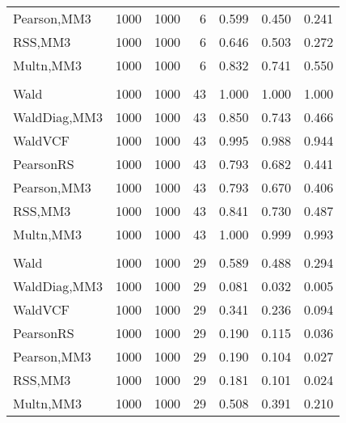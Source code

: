 \documentclass[
]{article}
\begin{document}
\begin{table}[H]
{\begin{tabular}[t]{lrrrrrr}
\hspace{1em}Pearson,MM3 & 1000 & 1000 & 6 & 0.599 & 0.450 & 0.241\\
\hspace{1em}RSS,MM3 & 1000 & 1000 & 6 & 0.646 & 0.503 & 0.272\\
\hspace{1em}Multn,MM3 & 1000 & 1000 & 6 & 0.832 & 0.741 & 0.550\\
\addlinespace[0.3em]
\multicolumn{7}{l}{\textbf{1F 15V}}\\
\hspace{1em}Wald & 1000 & 1000 & 43 & 1.000 & 1.000 & 1.000\\
\hspace{1em}WaldDiag,MM3 & 1000 & 1000 & 43 & 0.850 & 0.743 & 0.466\\
\hspace{1em}WaldVCF & 1000 & 1000 & 43 & 0.995 & 0.988 & 0.944\\
\hspace{1em}PearsonRS & 1000 & 1000 & 43 & 0.793 & 0.682 & 0.441\\
\hspace{1em}Pearson,MM3 & 1000 & 1000 & 43 & 0.793 & 0.670 & 0.406\\
\hspace{1em}RSS,MM3 & 1000 & 1000 & 43 & 0.841 & 0.730 & 0.487\\
\hspace{1em}Multn,MM3 & 1000 & 1000 & 43 & 1.000 & 0.999 & 0.993\\
\addlinespace[0.3em]
\multicolumn{7}{l}{\textbf{2F 10V}}\\
\hspace{1em}Wald & 1000 & 1000 & 29 & 0.589 & 0.488 & 0.294\\
\hspace{1em}WaldDiag,MM3 & 1000 & 1000 & 29 & 0.081 & 0.032 & 0.005\\
\hspace{1em}WaldVCF & 1000 & 1000 & 29 & 0.341 & 0.236 & 0.094\\
\hspace{1em}PearsonRS & 1000 & 1000 & 29 & 0.190 & 0.115 & 0.036\\
\hspace{1em}Pearson,MM3 & 1000 & 1000 & 29 & 0.190 & 0.104 & 0.027\\
\hspace{1em}RSS,MM3 & 1000 & 1000 & 29 & 0.181 & 0.101 & 0.024\\
\hspace{1em}Multn,MM3 & 1000 & 1000 & 29 & 0.508 & 0.391 & 0.210\\

\end{tabular}}
\end{table}
\end{document}
